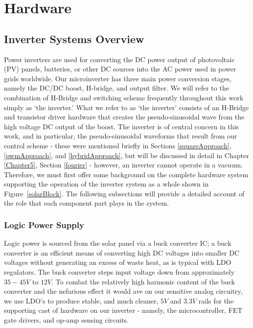 
\chapter{Hardware} %

\label{hardware} %



\section{Inverter Systems Overview}

Power inverters are used for converting the DC power output of photovoltaic (PV) panels, batteries, or other DC sources into the AC power used in power grids worldwide. Our microinverter has three main power conversion stages, namely the DC/DC boost, H-bridge, and output filter. We will refer to the combination of H-Bridge and switching scheme frequently throughout this work simply as `the inverter.'  What we refer to as `the inverter' consists of an H-Bridge and transistor driver hardware that creates the pseudo-sinusoidal wave from the high voltage DC output of the boost. The inverter is of central concern in this work, and in particular, the pseudo-sinusoidal waveforms that result from our control scheme - these were mentioned briefly in Sections \ref{squareApproach}, \ref{pwmApproach}, and \ref{hybridApproach}, but will be discussed in detail in Chapter \ref{Chapter5}, Section \ref{fourier} - however, an inverter cannot operate in a vacuum. Therefore, we must first offer some background on the complete hardware system supporting the operation of the inverter system as a whole shown in Figure~\ref{solarBlock}. The following subsections will provide a detailed account of the role that each component part plays in the system.

\subsection{Logic Power Supply}

Logic power is sourced from the solar panel via a buck converter IC; a buck converter is an efficient means of converting high DC voltages into smaller DC voltages without generating an excess of waste heat, as is typical with LDO regulators. The buck converter steps input voltage down from approximately $35-45V$ to $12V$. To combat the relatively high harmonic content of the buck converter and the nefarious effect it would ave on our sensitive analog circuitry, we use LDO's to produce stable, and much cleaner, $5V$ and $3.3V$ rails for the supporting cast of hardware on our inverter - namely, the microcontroller, FET gate drivers, and op-amp sensing circuits. 

